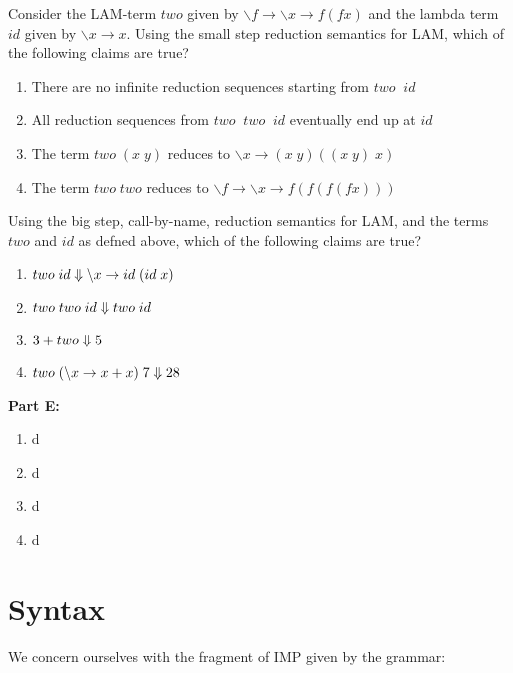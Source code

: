 \documentclass{article}
\begin{document}
 Consider the LAM-term $two$ given by $\backslash f
\rightarrow \backslash x \rightarrow  f (f x)$
and the lambda term $id$ given by $\backslash x \rightarrow x$. Using
the small step reduction semantics for LAM, which of the following claims are true?

\begin{enumerate}
\item There are no infinite reduction sequences starting from $two
  \;\; id$
\item All reduction sequences from $two \;\; two \;\; id$ eventually end up at $id$
\item The term $two \; (x \; y)$ reduces to $\backslash x \rightarrow
  (x \; y) ((x \; y) \; x)$  
\item The term $two \; two$ reduces to $\backslash f \rightarrow  \backslash x \rightarrow f ( f ( f ( f x)))$
\end{enumerate}



 Using the big step, call-by-name, reduction
semantics for LAM, and the terms $two$ and $id$ as defned above, which
of the following claims are true?

\begin{enumerate}
\item $two \; id \Downarrow \backslash x \rightarrow id \; (id \; x)$
\item $two \; two \; id \Downarrow two \; id$
\item $3 + two \Downarrow 5$
\item $two \; (\backslash x \rightarrow x + x) \; 7 \Downarrow 28$
\end{enumerate}


{\bf Part E:}

\begin{enumerate}
\item d
\item d
\item d
\item d
\end{enumerate}



\section{Syntax}

We concern ourselves with the fragment of IMP given by the grammar:
\end{document}
